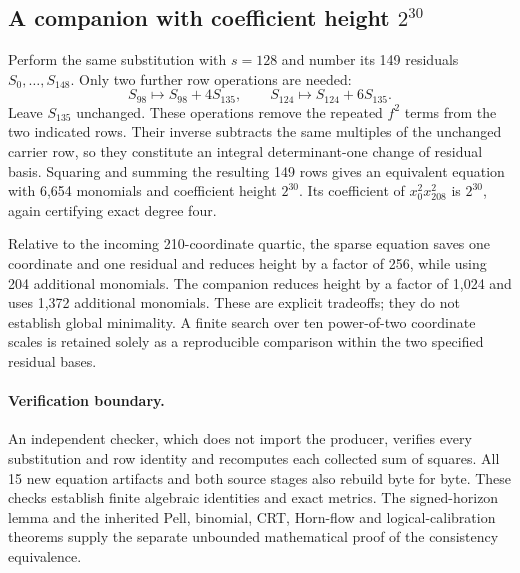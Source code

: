 \subsection{A companion with coefficient height $2^{30}$}

Perform the same substitution with $s=128$ and number its 149 residuals
$S_0,\ldots,S_{148}$.  Only two further row operations are needed:
\[
 S_{98}\longmapsto S_{98}+4S_{135},\qquad
 S_{124}\longmapsto S_{124}+6S_{135}.
\]
Leave $S_{135}$ unchanged.  These operations remove the repeated $f^2$
terms from the two indicated rows.  Their inverse subtracts the same
multiples of the unchanged carrier row, so they constitute an integral
determinant-one change of residual basis.  Squaring and summing the resulting
149 rows gives an equivalent equation with 6,654 monomials and coefficient
height $2^{30}$.  Its coefficient of $x_0^2x_{208}^2$ is $2^{30}$, again
certifying exact degree four.

Relative to the incoming 210-coordinate quartic, the sparse equation saves
one coordinate and one residual and reduces height by a factor of 256,
while using 204 additional monomials.  The companion reduces height by a
factor of 1,024 and uses 1,372 additional monomials.  These are explicit
tradeoffs; they do not establish global minimality.  A finite search over
ten power-of-two coordinate scales is retained solely as a reproducible
comparison within the two specified residual bases.

\paragraph{Verification boundary.}
An independent checker, which does not import the producer, verifies every
substitution and row identity and recomputes each collected sum of squares.
All 15 new equation artifacts and both source stages also rebuild byte for
byte.  These checks establish finite algebraic identities and exact metrics.
The signed-horizon lemma and the inherited Pell, binomial, CRT, Horn-flow and
logical-calibration theorems supply the separate unbounded mathematical
proof of the consistency equivalence.
